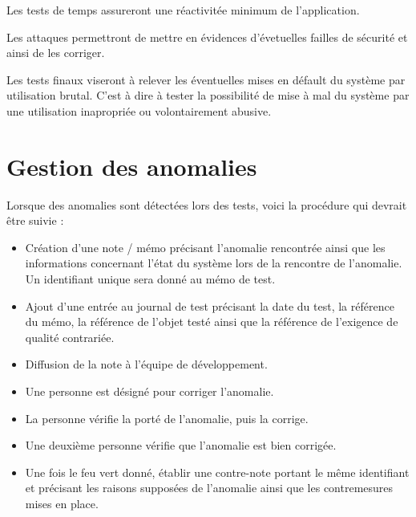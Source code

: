 \documentclass{"../../res/univ-projet"}
\begin{document}
  Les tests de temps assureront une réactivitée minimum de l'application.
  
  Les attaques permettront de mettre en évidences d'évetuelles failles de sécurité et ainsi de les corriger.
  
  Les tests finaux viseront à relever les éventuelles mises en défault du système par utilisation brutal. C'est à dire à tester la possibilité de mise à mal du système par une utilisation inapropriée ou volontairement abusive.
  
  \section{Gestion des anomalies}
  Lorsque des anomalies sont détectées lors des tests, voici la procédure qui devrait être suivie :
  \begin{itemize}
   \item Création d'une note / mémo précisant l'anomalie rencontrée ainsi que les informations concernant l'état du système lors de la rencontre de l'anomalie. Un 
   identifiant unique sera donné au mémo de test.
   \item Ajout d'une entrée au journal de test précisant la date du test, la référence du mémo, la référence de l'objet testé ainsi que la référence de l'exigence de 
   qualité contrariée.
   \item Diffusion de la note à l'équipe de développement.
   \item Une personne est désigné pour corriger l'anomalie.
   \item La personne vérifie la porté de l'anomalie, puis la corrige.
   \item Une deuxième personne vérifie que l'anomalie est bien corrigée.
   \item Une fois le feu vert donné, établir une contre-note portant le même identifiant et précisant les raisons supposées 
   de l'anomalie ainsi que les contremesures mises en place.
  \end{itemize}
\newpage
\end{document}
